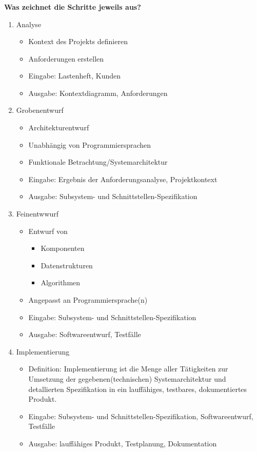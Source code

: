 \subsubsection{}
\textbf{Was zeichnet die Schritte jeweils aus?}
\begin{enumerate}
    \item Analyse\begin{itemize}
              \item Kontext des Projekts definieren
              \item Anforderungen erstellen
              \item Eingabe: Lastenheft, Kunden
              \item Ausgabe: Kontextdiagramm, Anforderungen
          \end{itemize}
    \item Grobenentwurf\begin{itemize}
              \item Architekturentwurf
              \item Unabhängig von Programmiersprachen
              \item Funktionale Betrachtung/Systemarchitektur
              \item Eingabe: Ergebnis der Anforderungsanalyse, Projektkontext
              \item Ausgabe: Subsystem- und Schnittstellen-Spezifikation
          \end{itemize}
    \item Feinentwwurf\begin{itemize}
              \item Entwurf von\begin{itemize}
                        \item Komponenten
                        \item Datenstrukturen
                        \item Algorithmen
                    \end{itemize}
              \item Angepasst an Programmiersprache(n)
              \item Eingabe: Subsystem- und Schnittstellen-Spezifikation
              \item Ausgabe: Softwareentwurf, Testfälle
          \end{itemize}
    \item Implementierung\begin{itemize}
              \item Definition: Implementierung ist die Menge aller Tätigkeiten zur Umsetzung der gegebenen(technischen) Systemarchitektur und detallierten Spezifikation in ein lauffähiges, testbares, dokumentiertes Produkt.
              \item Eingabe: Subsystem- und Schnittstellen-Spezifikation, Softwareentwurf, Testfälle
              \item Ausgabe: lauffähiges Produkt, Testplanung, Dokumentation
          \end{itemize}
\end{enumerate}

